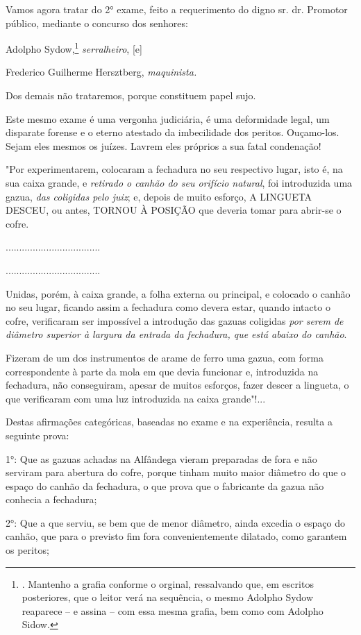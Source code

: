Vamos agora tratar do 2° exame, feito a requerimento do digno sr. dr.
Promotor público, mediante o concurso dos senhores:

Adolpho Sydow,\footnote{. Mantenho a grafia conforme o orginal,
  ressalvando que, em escritos posteriores, que o leitor verá na
  sequência, o mesmo Adolpho Sydow reaparece -- e assina -- com essa
  mesma grafia, bem como com Adolpho Sidow.} \emph{serralheiro}, {[}e{]}

Frederico Guilherme Hersztberg, \emph{maquinista.}

Dos demais não trataremos, porque constituem papel sujo.

Este mesmo exame é uma vergonha judiciária, é uma deformidade legal, um
disparate forense e o eterno atestado da imbecilidade dos peritos.
Ouçamo-los. Sejam eles mesmos os juízes. Lavrem eles próprios a sua
fatal condenação!

"Por experimentarem, colocaram a fechadura no seu respectivo lugar, isto
é, na sua caixa grande, e \emph{retirado o canhão do seu orifício
natural}, foi introduzida uma gazua, \emph{das coligidas pelo juiz}; e,
depois de muito esforço, A LINGUETA DESCEU, ou antes, TORNOU À POSIÇÃO
que deveria tomar para abrir-se o cofre.

...................................

...................................

Unidas, porém, à caixa grande, a folha externa ou principal, e colocado
o canhão no seu lugar, ficando assim a fechadura como devera estar,
quando intacto o cofre, verificaram ser impossível a introdução das
gazuas coligidas \emph{por serem de diâmetro superior à largura da
entrada da fechadura, que está abaixo do canhão}.

Fizeram de um dos instrumentos de arame de ferro uma gazua, com forma
correspondente à parte da mola em que devia funcionar e, introduzida na
fechadura, não conseguiram, apesar de muitos esforços, fazer descer a
lingueta, o que verificaram com uma luz introduzida na caixa grande"!...

Destas afirmações categóricas, baseadas no exame e na experiência,
resulta a seguinte prova:

1°: Que as gazuas achadas na Alfândega vieram preparadas de fora e não
serviram para abertura do cofre, porque tinham muito maior diâmetro do
que o espaço do canhão da fechadura, o que prova que o fabricante da
gazua não conhecia a fechadura;

2°: Que a que serviu, se bem que de menor diâmetro, ainda excedia o
espaço do canhão, que para o previsto fim fora convenientemente
dilatado, como garantem os peritos;

